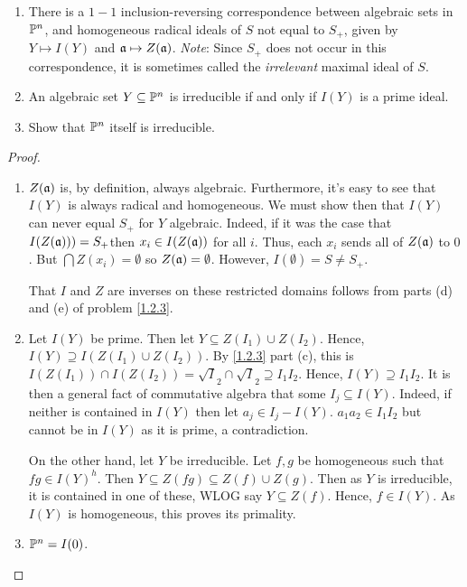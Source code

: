 \label{1.2.4}

\begin{enumerate}[label = (\alph*)]
    \item There is a $1-1$ inclusion-reversing correspondence between algebraic sets in $\P^n$, and homogeneous radical ideals of $S$ not equal to $S_+$, given by $Y \mapsto I(Y)$ and $\a \mapsto Z( \a)$. \textit{Note}: Since $S_+$ does not occur in this correspondence, it is sometimes called the \textit{irrelevant} maximal ideal of $S$.
    
    \item An algebraic set $Y \subseteq \P^n$ is irreducible if and only if $I(Y)$ is a prime ideal.
    
    \item Show that $\P^n$ itself is irreducible.
\end{enumerate}

\begin{proof}
	\begin{enumerate}[label=(\alph*)]
		\item $Z(\a)$ is, by definition, always algebraic. Furthermore, it's easy to see that $I(Y)$ is always radical and homogeneous. We must show then that $I(Y)$ can never equal $S_+$ for $Y$ algebraic. Indeed, if it was the case that $I(Z(\a)))=S_+$then $x_i \in I(Z(\a))$ for all $i$. Thus, each $x_i$ sends all of $Z(\a)$ to $0$. But $\bigcap Z(x_i) = \emptyset$ so $Z(\a)=\emptyset$. However, $I(\emptyset)=S\neq S_+$.

		That $I$ and $Z$ are inverses on these restricted domains follows from parts (d) and (e) of problem \ref{1.2.3}.

		\item Let $I(Y)$ be prime. Then let $Y \subseteq Z(I_1) \cup Z(I_2)$. Hence, $I(Y) \supseteq I(Z(I_1) \cup Z(I_2))$. By \ref{1.2.3} part (c), this is $I(Z(I_1))\cap I(Z(I_2)) = \sqrt I_2 \cap \sqrt I_2 \supseteq I_1 I_2$. Hence, $I(Y) \supseteq I_1 I_2$. It is then a general fact of commutative algebra that some $I_j \subseteq I(Y)$. Indeed, if neither is contained in $I(Y)$ then let $a_j \in I_j - I(Y)$. $a_1 a_2 \in I_1 I_2$ but cannot be in $I(Y)$ as it is prime, a contradiction.
	
		On the other hand, let $Y$ be irreducible. Let $f, g$ be homogeneous such that $fg \in I(Y)^h$. Then $Y \subseteq Z(fg) \subseteq Z(f) \cup Z(g)$. Then as $Y$ is irreducible, it is contained in one of these, WLOG say $Y \subseteq Z(f)$. Hence, $f \in I(Y)$. As $I(Y)$ is homogeneous, this proves its primality.

		\item $\P^n = I(0)$.
	\end{enumerate}
\end{proof}
